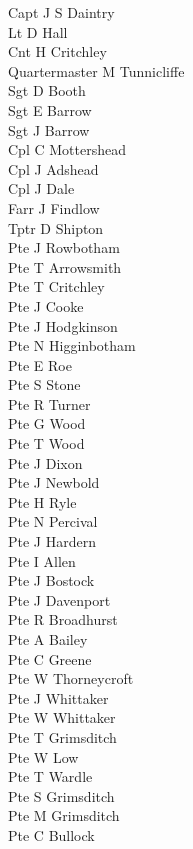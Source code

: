 \begin{multicols}{3}
  \small
  \noindent
  Capt J S Daintry \\
  Lt D Hall \\
  Cnt H Critchley \\
  Quartermaster M Tunnicliffe \\
  Sgt D Booth \\
  Sgt E Barrow \\
  Sgt J Barrow \\
  Cpl C Mottershead \\
  Cpl J Adshead \\
  Cpl J Dale \\
  Farr J Findlow \\
  Tptr D Shipton \\
  Pte J Rowbotham \\
  Pte T Arrowsmith \\
  Pte T Critchley \\
  Pte J Cooke \\
  Pte J Hodgkinson \\
  Pte N Higginbotham \\
  Pte E Roe \\
  Pte S Stone \\
  Pte R Turner \\
  Pte G Wood \\
  Pte T Wood \\
  Pte J Dixon \\
  Pte J Newbold \\
  Pte H Ryle \\
  Pte N Percival \\
  Pte J Hardern \\
  Pte I Allen \\
  Pte J Bostock \\
  Pte J Davenport \\
  Pte R Broadhurst \\
  Pte A Bailey \\
  Pte C Greene \\
  Pte W Thorneycroft \\
  Pte J Whittaker \\
  Pte W Whittaker \\
  Pte T Grimsditch \\
  Pte W Low \\
  Pte T Wardle \\
  Pte S Grimsditch \\
  Pte M Grimsditch \\
  Pte C Bullock \\

\end{multicols}
